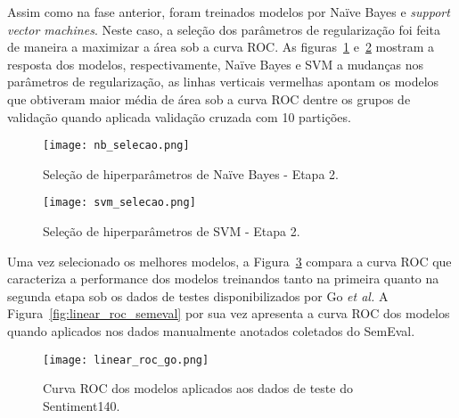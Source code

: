 Assim como na fase anterior, foram treinados modelos por Naïve Bayes e \textit{support vector machines}.
Neste caso, a seleção dos parâmetros de regularização foi feita de maneira a maximizar a área sob a curva ROC.
As figuras~\ref{fig:nb_selecao} e~\ref{fig:svm_selecao} mostram a resposta dos modelos, respectivamente, Naïve Bayes e
SVM a mudanças nos parâmetros de regularização, as linhas verticais vermelhas apontam os modelos que obtiveram maior
média de área sob a curva ROC dentre os grupos de validação quando aplicada validação cruzada com 10 partições.

\begin{figure}
\begin{center} {
    \begin{center}
    \texttt{[image: nb\_selecao.png]}
    \caption{Seleção de hiperparâmetros de Naïve Bayes - Etapa 2.}
    \label{fig:nb_selecao}
    \end{center}
}
\end{center}
\end{figure}

\begin{figure}
\begin{center} {
    \begin{center}
    \texttt{[image: svm\_selecao.png]}
    \caption{Seleção de hiperparâmetros de SVM - Etapa 2.}
    \label{fig:svm_selecao}
    \end{center}
}
\end{center}
\end{figure}

Uma vez selecionado os melhores modelos, a Figura~\ref{fig:linear_roc_go} compara a curva ROC que caracteriza a
performance dos modelos treinandos tanto na primeira quanto na segunda etapa sob os dados de testes disponibilizados
por Go \textit{et al.}
A Figura~\ref{fig:linear_roc_semeval} por sua vez apresenta a curva ROC dos modelos quando aplicados nos dados
manualmente anotados coletados do SemEval.

\begin{figure}
\begin{center} {
    \begin{center}
    \texttt{[image: linear\_roc\_go.png]}
    \caption{Curva ROC dos modelos aplicados aos dados de teste do Sentiment140.}
    \label{fig:linear_roc_go}
    \end{center}
}
\end{center}
\end{figure}

